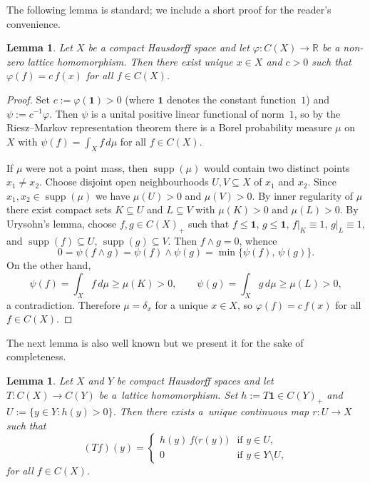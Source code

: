 \documentclass[11pt]{amsart}
\renewcommand{\le}{\leqslant}
\renewcommand{\ge}{\geqslant}
\numberwithin{equation}{section}
\newtheorem{lemma}[theorem]{Lemma}
\theoremstyle{definition}
\theoremstyle{remark}
\theoremstyle{plain}
\DeclareMathOperator{\supp}{supp}
\begin{document}
The following lemma is standard; we include a short proof for the reader's convenience.

\begin{lemma}\label{lem:eval}
Let $X$ be a compact Hausdorff space and let $\varphi\colon C(X)\to \mathbb R$ be a non-zero lattice
homomorphism.
Then there exist unique $x\in X$ and $c>0$ such that $\varphi(f)=c\,f(x)$ for all $f\in C(X)$.
\end{lemma}

\begin{proof}
Set $c:=\varphi(\mathbf{1})>0$ (where $\mathbf{1}$ denotes the constant function~$1$)
and $\psi:=c^{-1}\varphi$.
Then $\psi$ is a unital positive linear functional of norm~$1$, so by the
Riesz--Markov representation theorem there is a Borel probability measure $\mu$ on~$X$
with $\psi(f)=\int_X f\,d\mu$ for all $f\in C(X)$.

If $\mu$ were not a point mass, then $\supp(\mu)$ would contain two distinct points
$x_1\ne x_2$.
Choose disjoint open neighbourhoods $U,V\subseteq X$ of $x_1$ and $x_2$.
Since $x_1,x_2\in\supp(\mu)$ we have $\mu(U)>0$ and $\mu(V)>0$.
By inner regularity of $\mu$ there exist compact sets $K\subseteq U$ and $L\subseteq V$
with $\mu(K)>0$ and $\mu(L)>0$.
By Urysohn's lemma, choose $f,g\in C(X)_+$ such that
$f\le \mathbf{1}$, $g\le \mathbf{1}$,
$f|_{K}\equiv 1$, $g|_{L}\equiv 1$,
and $\supp(f)\subseteq U$, $\supp(g)\subseteq V$.
Then $f\wedge g=0$, whence
\[
0=\psi(f\wedge g)=\psi(f)\wedge \psi(g)
=\min\bigl\{\psi(f),\,\psi(g)\bigr\}.
\]
On the other hand,
\[
\psi(f)=\int_X f\,d\mu\ge \mu(K)>0,
\qquad
\psi(g)=\int_X g\,d\mu\ge \mu(L)>0,
\]
a contradiction.
Therefore $\mu=\delta_x$ for a unique $x\in X$,
so $\varphi(f)=c\,f(x)$ for all $f\in C(X)$.
\end{proof}

The next lemma is also well known but we present it for the sake of completeness.

\begin{lemma}\label{lem:weighted-composition}
Let $X$ and $Y$ be compact Hausdorff spaces and let $T\colon C(X)\to C(Y)$ be a~lattice homomorphism.
Set $h:=T\mathbf{1}\in C(Y)_+$ and $U:=\{y\in Y: h(y)>0\}$.
Then there exists a~unique continuous map $r\colon U\to X$ such that
\begin{equation}\label{eq:wc}
(Tf)(y)=
\begin{cases}
h(y)\,f\bigl(r(y)\bigr) & \text{if } y\in U,\\[2pt]
0 & \text{if } y\in Y\setminus U,
\end{cases}
\end{equation}
for all $f\in C(X)$.
\end{lemma}
\end{document}
